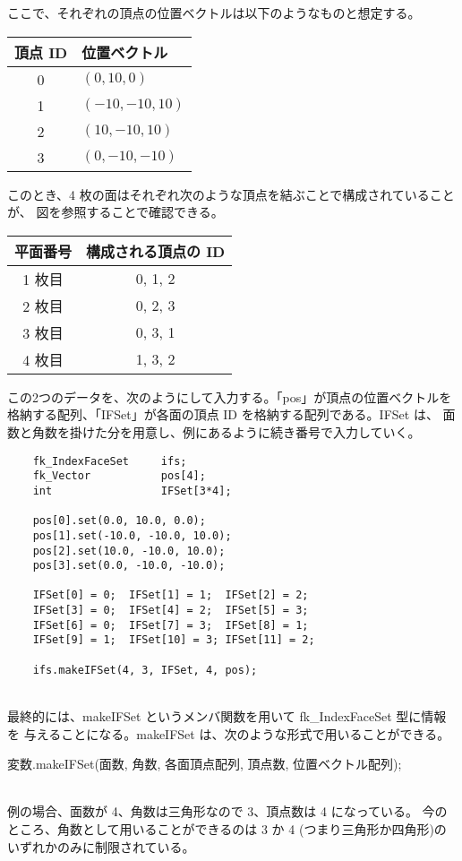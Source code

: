 ここで、それぞれの頂点の位置ベクトルは以下のようなものと想定する。
\begin{center}
\begin{tabular}{|c|l|}
\hline
頂点 ID & 位置ベクトル \\ \hline
0 & \((0, 10, 0)\) \\ \hline
1 & \((-10, -10, 10)\) \\ \hline
2 & \((10, -10, 10)\) \\ \hline
3 & \((0, -10, -10)\) \\ \hline
\end{tabular}
\end{center}
このとき、4 枚の面はそれぞれ次のような頂点を結ぶことで構成されていることが、
図を参照することで確認できる。
\begin{center}
\begin{tabular}{|c|c|}
\hline
平面番号 & 構成される頂点の ID \\ \hline
1 枚目 & 0, 1, 2 \\ \hline
2 枚目 & 0, 2, 3 \\ \hline
3 枚目 & 0, 3, 1 \\ \hline
4 枚目 & 1, 3, 2 \\ \hline
\end{tabular}
\end{center}
この2つのデータを、次のようにして入力する。「pos」が頂点の位置ベクトルを
格納する配列、「IFSet」が各面の頂点 ID を格納する配列である。IFSet は、
面数と角数を掛けた分を用意し、例にあるように続き番号で入力していく。
\\
\begin{breakbox}
\begin{verbatim}
    fk_IndexFaceSet     ifs;
    fk_Vector           pos[4];
    int                 IFSet[3*4];

    pos[0].set(0.0, 10.0, 0.0);
    pos[1].set(-10.0, -10.0, 10.0);
    pos[2].set(10.0, -10.0, 10.0);
    pos[3].set(0.0, -10.0, -10.0);

    IFSet[0] = 0;  IFSet[1] = 1;  IFSet[2] = 2;
    IFSet[3] = 0;  IFSet[4] = 2;  IFSet[5] = 3;
    IFSet[6] = 0;  IFSet[7] = 3;  IFSet[8] = 1;
    IFSet[9] = 1;  IFSet[10] = 3; IFSet[11] = 2;

    ifs.makeIFSet(4, 3, IFSet, 4, pos);
\end{verbatim}
\end{breakbox}
~ \\
最終的には、makeIFSet というメンバ関数を用いて fk\_IndexFaceSet 型に情報を
与えることになる。makeIFSet は、次のような形式で用いることができる。
\\
\begin{screen}
\begin{center}
変数.makeIFSet(面数, 角数, 各面頂点配列, 頂点数, 位置ベクトル配列);
\end{center}
\end{screen}
~ \\
例の場合、面数が 4、角数は三角形なので 3、頂点数は 4 になっている。
今のところ、角数として用いることができるのは 3 か 4
(つまり三角形か四角形)のいずれかのみに制限されている。

